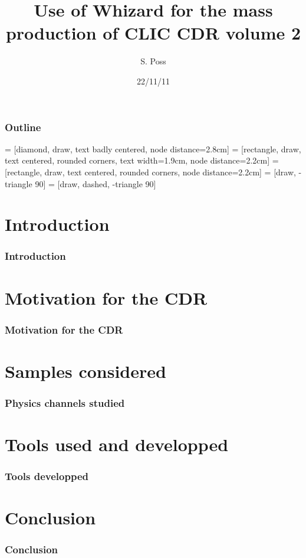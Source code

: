 \documentclass{beamer}
\author{S. Poss}
\title{Use of Whizard for the mass production of CLIC CDR volume 2}
\institute[CERN]
{
  CERN
}
\date{22/11/11}
\begin{document}
\begin{frame}
\titlepage
\end{frame}
\begin{frame}
\frametitle{Outline}
\tableofcontents
\end{frame}
 = [diamond, draw, text badly centered, node distance=2.8cm]
 = [rectangle, draw, text centered, rounded corners, text width=1.9cm, node distance=2.2cm]
 = [rectangle, draw, text centered, rounded corners, node distance=2.2cm]
 = [draw, -triangle 90]
 = [draw, dashed, -triangle 90]
\section{Introduction}

\begin{frame}
\frametitle{Introduction}

\end{frame}
\section{Motivation for the CDR}
\begin{frame}
\frametitle{Motivation for the CDR}
\end{frame}

\section{Samples considered}
\begin{frame}
\frametitle{Physics channels studied}

\end{frame}
\section{Tools used and developped}

\begin{frame}
\frametitle{Tools developped}

\end{frame}
\section{Conclusion}
\begin{frame}
\frametitle{Conclusion}

\end{frame}
\end{document}
